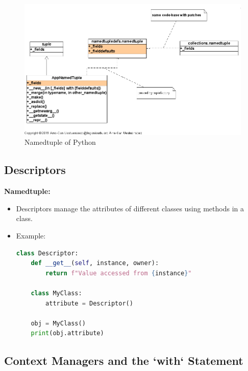 \documentclass[12pt]{article}
\begin{document}
\begin{figure}[h!]
\begin{center}
\includegraphics[width=12.5cm]{advanced4.png}\\
Namedtuple of Python
\end{center}
\end{figure}



\subsection{Descriptors}

\textbf{Namedtuple:}
\begin{itemize}
    \item Descriptors manage the attributes of different classes using methods in a class.

    \item Example:\\
    \begin{lstlisting}[language = Python]
    class Descriptor:
    def __get__(self, instance, owner):
        return f"Value accessed from {instance}"

    class MyClass:
        attribute = Descriptor()
    
    obj = MyClass()
    print(obj.attribute)
    \end{lstlisting}
    
\end{itemize}

\subsection{Context Managers and the `with` Statement}
\end{document}
